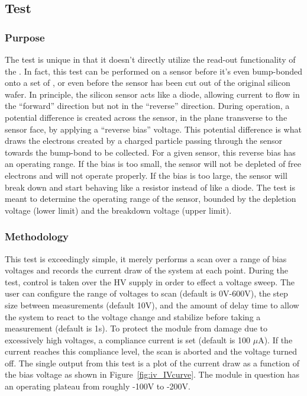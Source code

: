 
\newpage

\subsection{\iv Test}
\label{ss:iv}

\subsubsection{Purpose}

The \iv test is unique in that it doesn't directly utilize the read-out functionality of the \roc.
In fact, this test can be performed on a sensor before it's even bump-bonded onto a set of \rocs, 
or even before the sensor has been cut out of the original silicon wafer.
In principle, the silicon sensor acts like a diode, 
allowing current to flow in the ``forward'' direction but not in the ``reverse'' direction.
During operation, a potential difference is created across the sensor, in the plane transverse to the sensor face,
by applying a ``reverse bias'' voltage.
This potential difference is what draws the electrons created by a charged particle passing through the sensor 
towards the bump-bond to be collected.
For a given sensor, this reverse bias has an operating range.
If the bias is too small, the sensor will not be depleted of free electrons and will not operate properly.
If the bias is too large, the sensor will break down and start behaving like a resistor instead of like a diode.
The \iv test is meant to determine the operating range of the sensor, 
bounded by the depletion voltage (lower limit) and the breakdown voltage (upper limit).

\subsubsection{Methodology}

This test is exceedingly simple, it merely performs a scan over a range of bias voltages
and records the current draw of the system at each point.
During the test, control is taken over the HV supply in order to effect a voltage sweep.
The user can configure the range of voltages to scan (default is 0V-600V),
the step size between measurements (default 10V), 
and the amount of delay time to allow the system to react to the voltage change and stabilize before taking a measurement (default is 1s).
To protect the module from damage due to excessively high voltages, a compliance current is set (default is 100 $\mu$A).
If the current reaches this compliance level, the scan is aborted and the voltage turned off.
The single output from this test is a plot of the current draw as a function of the bias voltage
as shown in Figure~\ref{fig:iv_IVcurve}.
The module in question has an operating plateau from roughly -100V to -200V.

